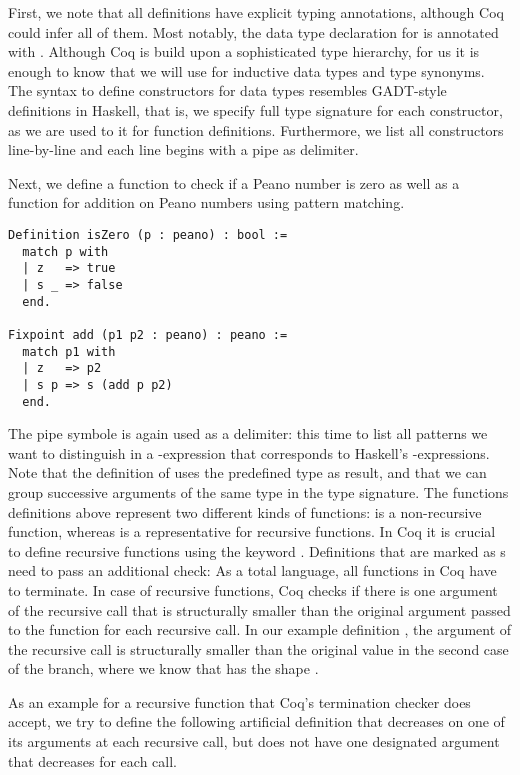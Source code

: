 First, we note that all definitions have explicit typing annotations, although Coq could infer all of them.
Most notably, the data type declaration for  is annotated with .
Although Coq is build upon a sophisticated type hierarchy, for us it is enough to know that we will use  for inductive data types and type synonyms.
The syntax to define constructors for data types resembles GADT-style definitions in Haskell, that is, we specify full type signature for each constructor, as we are used to it for function definitions.
Furthermore, we list all constructors line-by-line and each line begins with a pipe \cinl{|} as delimiter.

Next, we define a function to check if a Peano number is zero as well as a function for addition on Peano numbers using pattern matching.

\begin{verbatim}
Definition isZero (p : peano) : bool :=
  match p with
  | z   => true
  | s _ => false
  end.

Fixpoint add (p1 p2 : peano) : peano :=
  match p1 with
  | z   => p2
  | s p => s (add p p2)
  end.
\end{verbatim}

The pipe symbole \cinl{|} is again used as a delimiter: this time to list all patterns we want to distinguish in a -expression that corresponds to Haskell's -expressions.
Note that the definition of  uses the predefined  type as result, and that we can group successive arguments of the same type in the type signature.
The functions definitions above represent two different kinds of functions:  is a non-recursive function, whereas  is a representative for recursive functions.
In Coq it is crucial to define recursive functions using the keyword .
Definitions that are marked as s need to pass an additional check: As a total language, all functions in Coq have to terminate.
In case of recursive functions, Coq checks if there is one argument of the recursive call that is structurally smaller than the original argument passed to the function for each recursive call.
In our example definition , the argument  of the recursive call is structurally smaller than the original value  in the second case of the branch, where we know that  has the shape .

As an example for a recursive function that Coq's termination checker does accept, we try to define the following artificial definition that decreases on one of its arguments at each recursive call, but does not have one designated argument that decreases for each call.

